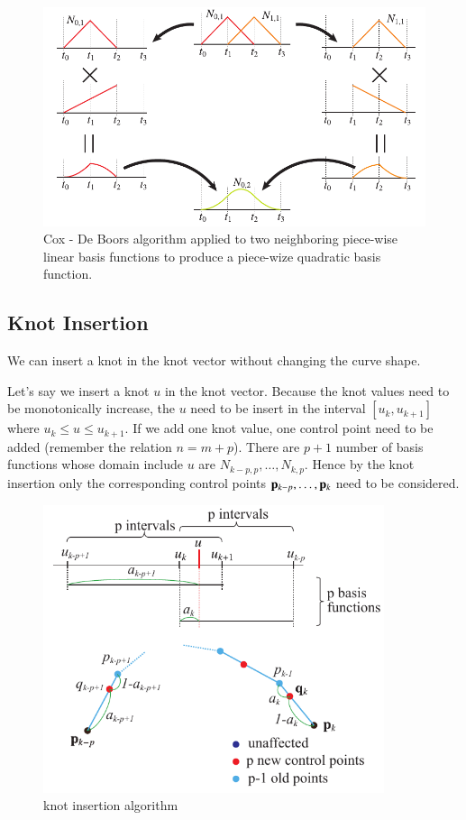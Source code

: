 \begin{figure}[htbp!]
\center
\includegraphics[width=140mm]{images/deboor_operation.pdf}
\caption{Cox - De Boors algorithm applied to two neighboring piece-wise linear basis functions to produce a piece-wize quadratic basis function.}
\label{fig:deboor_operation}
\end{figure}


\subsection{Knot Insertion}

We can insert a knot in the knot vector without changing the curve shape.



Let's say we insert a knot $u$ in the knot vector.
%
Because the knot values need to be monotonically increase, the $u$ need to be insert in the interval $[u_k,u_{k+1}]$ where $ u_k\le  u \le u_{k+1}$.
%
If we add one knot value, one control point need to be added (remember the relation $n=m+p$).
%
There are $p+1$ number of basis functions whose domain include $u$ are $N_{k-p,p},\ldots,N_{k,p}$.
%
Hence by the knot insertion only the corresponding control points $\mathbf{p}_{k-p},\ldots,\mathbf{p}_k$ need to be considered. 

 



\begin{figure}[htbp!]
\center
\includegraphics[width=100mm]{images/deboor_insert.pdf}
\caption{knot insertion algorithm}
\label{fig:deboor_insert}
\end{figure}


